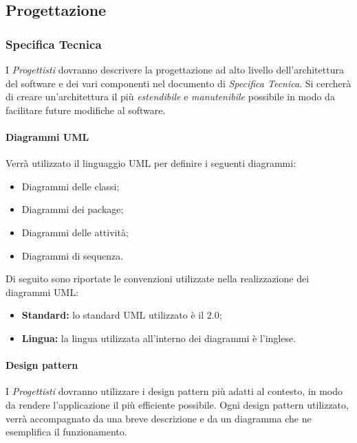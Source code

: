 \subsection{Progettazione}
\label{progettazione}

\subsubsection{Specifica Tecnica}
\label{specifica}
I \emph{Progettisti} dovranno descrivere la progettazione ad alto livello dell'architettura del software e dei vari componenti nel documento di \emph{Specifica Tecnica}. Si cercherà di creare un'architettura il più \emph{estendibile} e \emph{manutenibile} possibile in modo da facilitare future modifiche al software.

\paragraph{Diagrammi UML\\}
\label{diagrammi_uml_st}
Verrà utilizzato il linguaggio UML\glossario{} per definire i seguenti diagrammi:
\begin{itemize}
\item Diagrammi delle classi;
\item Diagrammi dei package;
\item Diagrammi delle attività;
\item Diagrammi di sequenza.
\end{itemize}
Di seguito sono riportate le convenzioni utilizzate nella realizzazione dei diagrammi UML\glossario{}:
\begin{itemize}
	\item\textbf{Standard:} lo standard UML\glossario{} utilizzato è il 2.0;
	\item\textbf{Lingua:} la lingua utilizzata all'interno dei diagrammi è l'inglese.
\end{itemize}

\paragraph{Design pattern\\}
\label{design_pattern_st}
I \emph{Progettisti} dovranno utilizzare i design pattern\glossario{} più adatti al contesto, in modo da rendere l'applicazione il più efficiente possibile. Ogni design pattern\glossario{} utilizzato, verrà accompagnato da una breve descrizione e da un diagramma che ne esemplifica il funzionamento.

